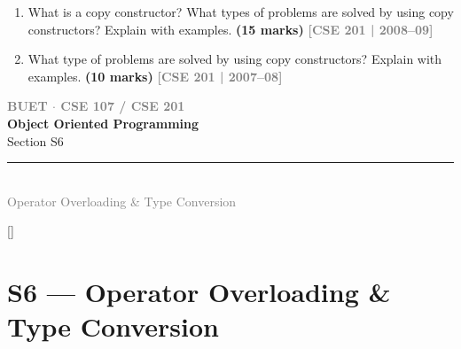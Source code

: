 \documentclass[12pt,a3paper]{article}
\newcommand{\yr}[1]{\hfill\textcolor{gray}{\small\textbf{[#1]}}}
\newcommand{\mk}[1]{\textcolor{orange!70!black}{\small\textbf{(#1 marks)}}}
\newcommand{\secdivider}[4]{%
  \newpage\thispagestyle{empty}%
  \vspace*{\fill}%
  \begin{tcolorbox}[enhanced,colback=#4!7,colframe=#3,boxrule=1.5pt,arc=8pt,
    left=20pt,right=20pt,top=22pt,bottom=22pt,
    shadow={3pt}{-3pt}{0pt}{black!15}]
    \centering
    {\large\textcolor{gray}{\textbf{BUET $\cdot$ CSE 107 / CSE 201}}}\\[8pt]
    {\fontsize{26}{32}\selectfont\bfseries\textcolor{#3}{Object Oriented Programming}}\\[6pt]
    {\fontsize{15}{19}\selectfont\textcolor{dgray}{#1}}\\[12pt]
    \textcolor{#3!60}{\rule{0.5\textwidth}{0.5pt}}\\[6pt]
    {\small\textcolor{gray}{#2}}
  \end{tcolorbox}%
  \vspace*{\fill}\newpage%
}
\begin{document}
\begin{enumerate}



\item What is a copy constructor? What types of problems are solved by using copy constructors? Explain with examples. \mk{15}
\yr{CSE 201 | 2008--09}



\item What type of problems are solved by using copy constructors? Explain with examples. \mk{10}
\yr{CSE 201 | 2007--08}





\end{enumerate}
\newpage

\secdivider{Section S6}{Operator Overloading \& Type Conversion}{cF}{cF}
\label{sec:S6}
\titleformat{\section}{\large\bfseries\color{cF}}{}{0em}{}[\titlerule]
\section{S6 --- Operator Overloading \& Type Conversion}
\end{document}

